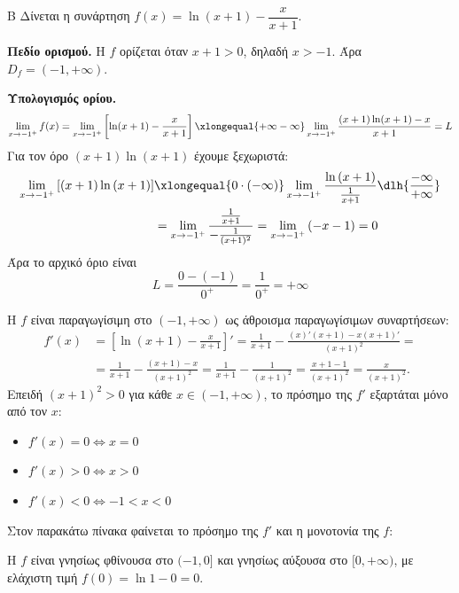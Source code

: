 \begin{thema}{Β}
Δίνεται η συνάρτηση $f(x) = \ln(x+1) - \dfrac{x}{x+1}$.

\begin{erwthma}

\item \textbf{Πεδίο ορισμού.}
Η $f$ ορίζεται όταν $x+1>0$, δηλαδή $x>-1$. Άρα $D_f = (-1, +\infty)$.

\textbf{Υπολογισμός ορίου.}
\begin{align*}
\lim_{x\to-1^+} f(x) = \lim_{x\to-1^+}\left[\ln(x+1) - \frac{x}{x+1}\right]\xlongequal{+\infty-\infty}\lim\limits_{x\to-1^+}\frac{(x+1)\ln(x+1) - x}{x+1}=L
\end{align*}
Για τον όρο $(x+1)\ln{(x+1)}$ έχουμε ξεχωριστά:
\begin{align*}
\lim\limits_{x\to-1^+}{\left[(x+1)\ln{(x+1)}\right]}&\xlongequal{0\cdot(-\infty)}\lim\limits_{x\to-1^+}{\frac{\ln{(x+1)}}{\frac{1}{x+1}}}\dlh{\frac{-\infty}{+\infty}}\\&=\lim\limits_{x\to-1^+}{\frac{\frac{1}{x+1}}{-\frac{1}{(x+1)^2}}}=\lim\limits_{x\to-1^+}{(-x-1)}=0
\end{align*}
Άρα το αρχικό όριο είναι
\[L=\frac{0-(-1)}{0^+}=\frac{1}{0^+}=+\infty\]
\item Η $f$ είναι παραγωγίσιμη στο $(-1,+\infty)$ ως άθροισμα παραγωγίσιμων συναρτήσεων:
\begin{align*}
f'(x) &=\left[\ln{(x+1)}-\frac{x}{x+1}\right]'= \frac{1}{x+1} - \frac{(x)'(x+1)-x(x+1)'}{(x+1)^2}=\\
&= \frac{1}{x+1} - \frac{(x+1)-x}{(x+1)^2}
= \frac{1}{x+1} - \frac{1}{(x+1)^2}
= \frac{x+1-1}{(x+1)^2} = \frac{x}{(x+1)^2}.
\end{align*}
Επειδή $(x+1)^2>0$ για κάθε $x\in(-1,+\infty)$, το πρόσημο της $f'$ εξαρτάται μόνο από τον $x$:
\begin{itemize}
    \item $f'(x)=0 \Leftrightarrow x=0$
    \item $f'(x)>0 \Leftrightarrow x>0$
    \item $f'(x)<0 \Leftrightarrow -1<x<0$
\end{itemize}
Στον παρακάτω πίνακα φαίνεται το πρόσημο της $f'$ και η μονοτονία της $f$:
\begin{center}
\end{center}
Η $f$ είναι γνησίως φθίνουσα στο $(-1,0]$ και γνησίως αύξουσα στο $[0,+\infty)$, με ελάχιστη τιμή $f(0) = \ln1 - 0 = 0$.


\end{erwthma}
\end{thema}
